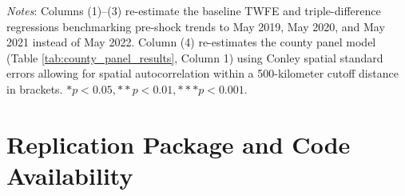 \documentclass[12pt]{article}
\begin{document}
\begin{table}[htbp]
\centering
\caption{\textbf{Sensitivity to Alternative Pre-Shock Base Years and Spatial Error Clustering}}
\label{tab:app_robustness_clustering}
\par\vspace{6pt}
\begin{minipage}{\linewidth}
\footnotesize
\textit{Notes}: Columns (1)--(3) re-estimate the baseline TWFE and triple-difference regressions benchmarking pre-shock trends to May 2019, May 2020, and May 2021 instead of May 2022. Column (4) re-estimates the county panel model (Table \ref{tab:county_panel_results}, Column 1) using Conley spatial standard errors allowing for spatial autocorrelation within a 500-kilometer cutoff distance in brackets. $* p < 0.05, ** p < 0.01, *** p < 0.001$.
\end{minipage}
\end{table}

\newpage
\section{Replication Package and Code Availability}
\label{app:replication}
\end{document}
